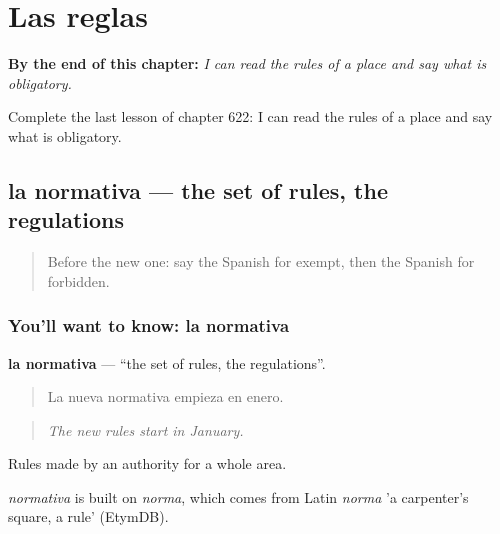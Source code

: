 
\chapter{Las reglas}
\label{ch:es-las-reglas}

\begin{chapteropening}
\textbf{By the end of this chapter:} \emph{I can read the rules of a place and say what is obligatory.}

Complete the last lesson of chapter 622: I can read the rules of a place and say what is obligatory.
\end{chapteropening}

\section[la normativa]{la normativa — the set of rules, the regulations}

\label{lesson:ES-C622-normativa}



\begin{quote}
Before the new one: say the Spanish for exempt, then the Spanish for forbidden.
\end{quote}

\subsection*{You'll want to know: la normativa}
\textbf{la normativa} — \textquotedblleft{}the set of rules, the regulations\textquotedblright{}.

\begin{quote}
La nueva normativa empieza en enero.
\end{quote}

\begin{quote}
\emph{The new rules start in January.}
\end{quote}

Rules made by an authority for a whole area.

\begin{cousinweb}
\emph{normativa} is built on \emph{norma}, which comes from Latin \emph{norma} 'a carpenter's square, a rule' (EtymDB).
\end{cousinweb}

